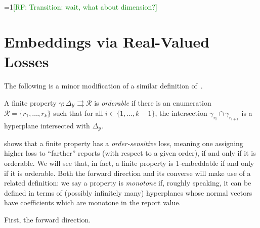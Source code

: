 \documentclass[anon,12pt]{colt2019}
\newcommand{\Comments}{1}
\newcommand{\mynote}[2]{\ifnum\Comments=1\textcolor{#1}{#2}\fi}
\newcommand{\raf}[1]{\mynote{green}{[RF: #1]}}
\newcommand{\simplex}{\Delta_\Y}
\newcommand{\R}{\mathcal{R}}
\newcommand{\Y}{\mathcal{Y}}
\newcommand{\toto}{\rightrightarrows}
\begin{document}
\raf{Transition: wait, what about dimension?}

\section{Embeddings via Real-Valued Losses}

The following is a minor modification of a similar definition of~\citet{lambert2018elicitation}.
\begin{definition}
  A finite property $\gamma:\simplex\toto\R$ is \emph{orderable} if there is an enumeration $\R = \{r_1,\ldots,r_k\}$ such that for all $i\in\{1,\ldots,k-1\}$, the intersection $\gamma_{r_i} \cap \gamma_{r_{i+1}}$ is a hyperplane intersected with $\simplex$.
\end{definition}

\citet{lambert2018elicitation} shows that a finite property has a \emph{order-sensitive} loss, meaning one assigning higher loss to ``farther'' reports (with respect to a given order), if and only if it is orderable.
We will see that, in fact, a finite property is 1-embeddable if and only if it is orderable.
Both the forward direction and its converse will make use of a related definition: we say a property is \emph{monotone} if, roughly speaking, it can be defined in terms of (possibly infinitely many) hyperplanes whose normal vectors have coefficients which are monotone in the report value.

First, the forward direction.
\end{document}
